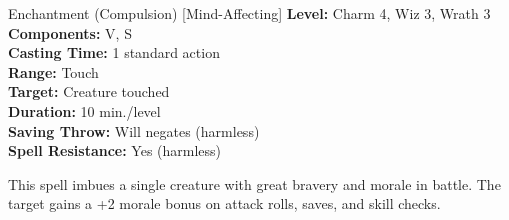 {Enchantment (Compulsion) [Mind-Affecting]}
{
	\textbf{Level:}
	Charm 4, Wiz 3, Wrath 3\\
	\textbf{Components:}
	V, S\\
	\textbf{Casting Time:}
	1 standard action\\
	\textbf{Range:}
	Touch\\
	\textbf{Target:}
	Creature touched\\
	\textbf{Duration:}
	10 min./level\\
	\textbf{Saving Throw:}
	Will negates (harmless)\\
	\textbf{Spell Resistance:}
	Yes (harmless)\\
}
{
	This spell imbues a single creature with great bravery and morale in battle. The target gains a +2 morale bonus on attack rolls, saves, and skill checks.

}

